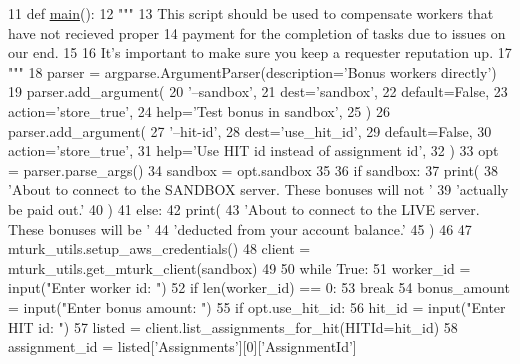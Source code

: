 \begin{DoxyCode}
11 \textcolor{keyword}{def }\hyperlink{namespaceparlai_1_1mturk_1_1scripts_1_1bonus__workers_aafc7a350f4abb5524c1b7477b3fc2bda}{main}():
12     \textcolor{stringliteral}{"""}
13 \textcolor{stringliteral}{    This script should be used to compensate workers that have not recieved proper}
14 \textcolor{stringliteral}{    payment for the completion of tasks due to issues on our end.}
15 \textcolor{stringliteral}{}
16 \textcolor{stringliteral}{    It's important to make sure you keep a requester reputation up.}
17 \textcolor{stringliteral}{    """}
18     parser = argparse.ArgumentParser(description=\textcolor{stringliteral}{'Bonus workers directly'})
19     parser.add\_argument(
20         \textcolor{stringliteral}{'--sandbox'},
21         dest=\textcolor{stringliteral}{'sandbox'},
22         default=\textcolor{keyword}{False},
23         action=\textcolor{stringliteral}{'store\_true'},
24         help=\textcolor{stringliteral}{'Test bonus in sandbox'},
25     )
26     parser.add\_argument(
27         \textcolor{stringliteral}{'--hit-id'},
28         dest=\textcolor{stringliteral}{'use\_hit\_id'},
29         default=\textcolor{keyword}{False},
30         action=\textcolor{stringliteral}{'store\_true'},
31         help=\textcolor{stringliteral}{'Use HIT id instead of assignment id'},
32     )
33     opt = parser.parse\_args()
34     sandbox = opt.sandbox
35 
36     \textcolor{keywordflow}{if} sandbox:
37         print(
38             \textcolor{stringliteral}{'About to connect to the SANDBOX server. These bonuses will not '}
39             \textcolor{stringliteral}{'actually be paid out.'}
40         )
41     \textcolor{keywordflow}{else}:
42         print(
43             \textcolor{stringliteral}{'About to connect to the LIVE server. These bonuses will be '}
44             \textcolor{stringliteral}{'deducted from your account balance.'}
45         )
46 
47     mturk\_utils.setup\_aws\_credentials()
48     client = mturk\_utils.get\_mturk\_client(sandbox)
49 
50     \textcolor{keywordflow}{while} \textcolor{keyword}{True}:
51         worker\_id = input(\textcolor{stringliteral}{"Enter worker id: "})
52         \textcolor{keywordflow}{if} len(worker\_id) == 0:
53             \textcolor{keywordflow}{break}
54         bonus\_amount = input(\textcolor{stringliteral}{"Enter bonus amount: "})
55         \textcolor{keywordflow}{if} opt.use\_hit\_id:
56             hit\_id = input(\textcolor{stringliteral}{"Enter HIT id: "})
57             listed = client.list\_assignments\_for\_hit(HITId=hit\_id)
58             assignment\_id = listed[\textcolor{stringliteral}{'Assignments'}][0][\textcolor{stringliteral}{'AssignmentId'}]

\end{DoxyCode}
